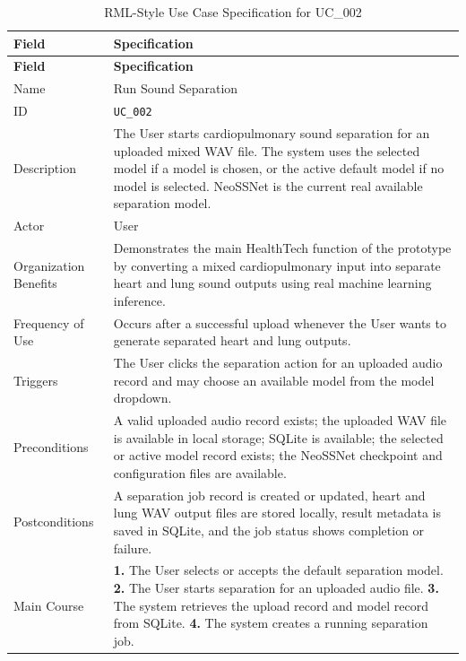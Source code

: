 \clearpage
\begin{longtable}{@{}p{} p{}@{}}
  \caption{RML-Style Use Case Specification for UC\_002}
  \label{tab:uc002-run-sound-separation} \\
  \toprule
  \textbf{Field} & \textbf{Specification} \\
  \midrule
  \endfirsthead
  \toprule
  \textbf{Field} & \textbf{Specification} \\
  \midrule
  \endhead
  \bottomrule
  \endfoot
  Name & Run Sound Separation \\
  ID & \texttt{UC\_002} \\
  Description & The User starts cardiopulmonary sound separation for an uploaded mixed WAV file. The system uses the selected model if a model is chosen, or the active default model if no model is selected. NeoSSNet is the current real available separation model. \\
  Actor & User \\
  Organization Benefits & Demonstrates the main HealthTech function of the prototype by converting a mixed cardiopulmonary input into separate heart and lung sound outputs using real machine learning inference. \\
  Frequency of Use & Occurs after a successful upload whenever the User wants to generate separated heart and lung outputs. \\
  Triggers & The User clicks the separation action for an uploaded audio record and may choose an available model from the model dropdown. \\
  Preconditions & A valid uploaded audio record exists; the uploaded WAV file is available in local storage; SQLite is available; the selected or active model record exists; the NeoSSNet checkpoint and configuration files are available. \\
  Postconditions & A separation job record is created or updated, heart and lung WAV output files are stored locally, result metadata is saved in SQLite, and the job status shows completion or failure. \\
  Main Course & \textbf{1.} The User selects or accepts the default separation model. \newline
  \textbf{2.} The User starts separation for an uploaded audio file. \newline
  \textbf{3.} The system retrieves the upload record and model record from SQLite. \newline
  \textbf{4.} The system creates a running separation job. \newline

\end{longtable}
